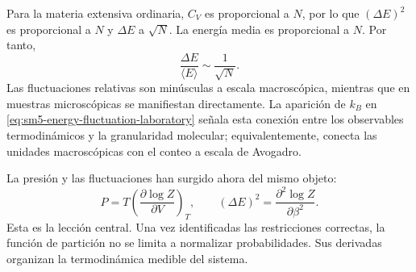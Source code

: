 \begin{classroomqa}\end{classroomqa}

Para la materia extensiva ordinaria, \(C_V\) es proporcional a \(N\), por lo que \((\Delta E)^2\) es proporcional a \(N\) y \(\Delta E\) a \(\sqrt{N}\). La energía media es proporcional a \(N\). Por tanto, \begin{equation}
 \frac{\Delta E}{\langle E\rangle}\sim\frac{1}{\sqrt{N}}.
 \label{eq:sm5-relative-fluctuation-scaling}
\end{equation} Las fluctuaciones relativas son minúsculas a escala macroscópica, mientras que en muestras microscópicas se manifiestan directamente. La aparición de \(k_B\) en \eqref{eq:sm5-energy-fluctuation-laboratory} señala esta conexión entre los observables termodinámicos y la granularidad molecular; equivalentemente, conecta las unidades macroscópicas con el conteo a escala de Avogadro.

La presión y las fluctuaciones han surgido ahora del mismo objeto: \[
 P=T\left(\frac{\partial\log Z}{\partial V}\right)_T,
 \qquad
 (\Delta E)^2=\frac{\partial^2\log Z}{\partial\beta^2}.
\] Esta es la lección central. Una vez identificadas las restricciones correctas, la función de partición no se limita a normalizar probabilidades. Sus derivadas organizan la termodinámica medible del sistema.